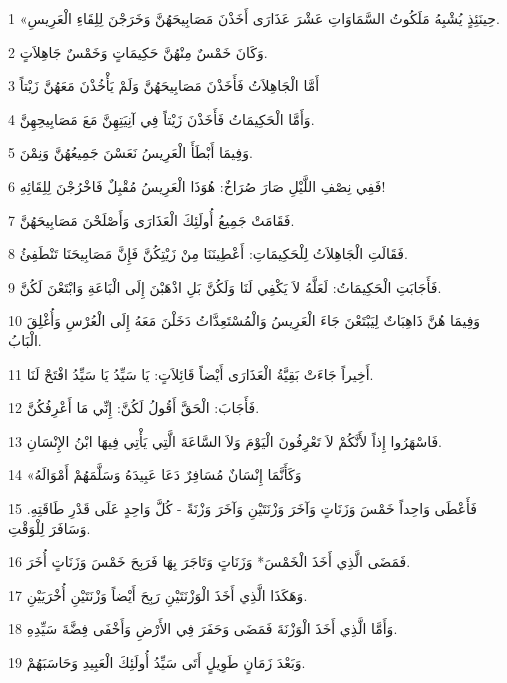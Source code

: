 \par 1 «حِينَئِذٍ يُشْبِهُ مَلَكُوتُ السَّمَاوَاتِ عَشْرَ عَذَارَى أَخَذْنَ مَصَابِيحَهُنَّ وَخَرَجْنَ لِلِقَاءِ الْعَرِيسِ.
\par 2 وَكَانَ خَمْسٌ مِنْهُنَّ حَكِيمَاتٍ وَخَمْسٌ جَاهِلاَتٍ.
\par 3 أَمَّا الْجَاهِلاَتُ فَأَخَذْنَ مَصَابِيحَهُنَّ وَلَمْ يَأْخُذْنَ مَعَهُنَّ زَيْتاً
\par 4 وَأَمَّا الْحَكِيمَاتُ فَأَخَذْنَ زَيْتاً فِي آنِيَتِهِنَّ مَعَ مَصَابِيحِهِنَّ.
\par 5 وَفِيمَا أَبْطَأَ الْعَرِيسُ نَعَسْنَ جَمِيعُهُنَّ وَنِمْنَ.
\par 6 فَفِي نِصْفِ اللَّيْلِ صَارَ صُرَاخٌ: هُوَذَا الْعَرِيسُ مُقْبِلٌ فَاخْرُجْنَ لِلِقَائِهِ!
\par 7 فَقَامَتْ جَمِيعُ أُولَئِكَ الْعَذَارَى وَأَصْلَحْنَ مَصَابِيحَهُنَّ.
\par 8 فَقَالَتِ الْجَاهِلاَتُ لِلْحَكِيمَاتِ: أَعْطِينَنَا مِنْ زَيْتِكُنَّ فَإِنَّ مَصَابِيحَنَا تَنْطَفِئُ.
\par 9 فَأَجَابَتِ الْحَكِيمَاتُ: لَعَلَّهُ لاَ يَكْفِي لَنَا وَلَكُنَّ بَلِ اذْهَبْنَ إِلَى الْبَاعَةِ وَابْتَعْنَ لَكُنَّ.
\par 10 وَفِيمَا هُنَّ ذَاهِبَاتٌ لِيَبْتَعْنَ جَاءَ الْعَرِيسُ وَالْمُسْتَعِدَّاتُ دَخَلْنَ مَعَهُ إِلَى الْعُرْسِ وَأُغْلِقَ الْبَابُ.
\par 11 أَخِيراً جَاءَتْ بَقِيَّةُ الْعَذَارَى أَيْضاً قَائِلاَتٍ: يَا سَيِّدُ يَا سَيِّدُ افْتَحْ لَنَا.
\par 12 فَأَجَابَ: الْحَقَّ أَقُولُ لَكُنَّ: إِنِّي مَا أَعْرِفُكُنَّ.
\par 13 فَاسْهَرُوا إِذاً لأَنَّكُمْ لاَ تَعْرِفُونَ الْيَوْمَ وَلاَ السَّاعَةَ الَّتِي يَأْتِي فِيهَا ابْنُ الإِنْسَانِ.
\par 14 «وَكَأَنَّمَا إِنْسَانٌ مُسَافِرٌ دَعَا عَبِيدَهُ وَسَلَّمَهُمْ أَمْوَالَهُ
\par 15 فَأَعْطَى وَاحِداً خَمْسَ وَزَنَاتٍ وَآخَرَ وَزْنَتَيْنِ وَآخَرَ وَزْنَةً - كُلَّ وَاحِدٍ عَلَى قَدْرِ طَاقَتِهِ. وَسَافَرَ لِلْوَقْتِ.
\par 16 فَمَضَى الَّذِي أَخَذَ الْخَمْسَ* وَزَنَاتٍ وَتَاجَرَ بِهَا فَرَبِحَ خَمْسَ وَزَنَاتٍ أُخَرَ.
\par 17 وَهَكَذَا الَّذِي أَخَذَ الْوَزْنَتَيْنِ رَبِحَ أَيْضاً وَزْنَتَيْنِ أُخْرَيَيْنِ.
\par 18 وَأَمَّا الَّذِي أَخَذَ الْوَزْنَةَ فَمَضَى وَحَفَرَ فِي الأَرْضِ وَأَخْفَى فِضَّةَ سَيِّدِهِ.
\par 19 وَبَعْدَ زَمَانٍ طَوِيلٍ أَتَى سَيِّدُ أُولَئِكَ الْعَبِيدِ وَحَاسَبَهُمْ.
